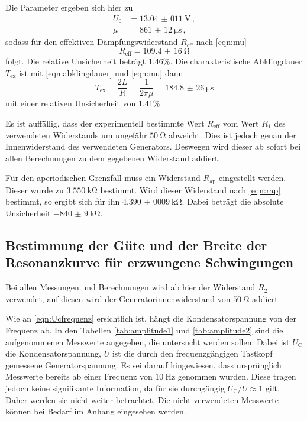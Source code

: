 Die Parameter ergeben sich hier zu
\begin{align*}
  U_0 &= \SI{13,04(011)}{\volt}\,, \\
  \mu &= \SI{861(12)}{\micro\second}\,,
\end{align*}
sodass für den effektiven Dämpfungswiderstand $R_\text{eff}$ nach \eqref{eqn:mu}
\begin{equation*}
  R_\text{eff} = \SI{109,4(16)}{\ohm}
\end{equation*}
folgt. Die relative Unsicherheit beträgt 1,46\%. Die charakteristische
Abklingdauer $T_\text{ex}$ ist mit \eqref{eqn:abklingdauer} und \eqref{eqn:mu} dann
\begin{equation*}
  T_\text{ex} = \frac{2L}{R} = \frac{1}{2\pi \mu} = \SI{184,8(26)}{\micro\second}
\end{equation*}
mit einer relativen Unsicherheit von 1,41\%.

Es ist auffällig, dass der experimentell bestimmte Wert $R_\text{eff}$ vom Wert $R_1$ des verwendeten
Widerstands um ungefähr $\SI{50}{\ohm}$ abweicht. Dies ist jedoch genau der Innenwiderstand
des verwendeten Generators. Deswegen wird dieser ab sofort bei allen Berechnungen zu dem
gegebenen Widerstand addiert.

Für den aperiodischen Grenzfall muss ein Widerstand $R_\text{ap}$ eingestellt werden.
Dieser wurde zu $\SI{3,550}{\kilo\ohm}$ bestimmt. Wird dieser Widerstand nach
\eqref{eqn:rap} bestimmt, so ergibt sich für ihn $\SI{4,390(0009)}{\kilo\ohm}$.
Dabei beträgt die absolute Unsicherheit $\SI{-840(9)}{\kilo\ohm}$.

\subsection{Bestimmung der Güte und der Breite der Resonanzkurve für erzwungene Schwingungen}
Bei allen Messungen und Berechnungen wird ab hier der Widerstand $R_2$ verwendet,
auf diesen wird der Generatorinnenwiderstand von $\SI{50}{\ohm}$ addiert.

Wie an \eqref{eqn:Ucfrequenz} ersichtlich ist, hängt die Kondensatorspannung von
der Frequenz ab. In den Tabellen \ref{tab:amplitude1} und \ref{tab:amplitude2} sind die aufgenommenen Messwerte
angegeben, die untersucht werden sollen. Dabei ist $U_\text{C}$ die Kondensatorspannung,
$U$ ist die durch den frequenzgängigen Tastkopf gemessene Generatorspannung.
Es sei darauf hingewiesen, dass ursprünglich Messwerte bereits ab einer
Frequenz von $\SI{10}{\hertz}$ genommen wurden. Diese tragen jedoch keine
signifikante Information, da für sie durchgängig $U_\text{C}/U \approx 1$ gilt.
Daher werden sie nicht weiter betrachtet. Die nicht verwendeten Messwerte können
bei Bedarf im Anhang eingesehen werden.

